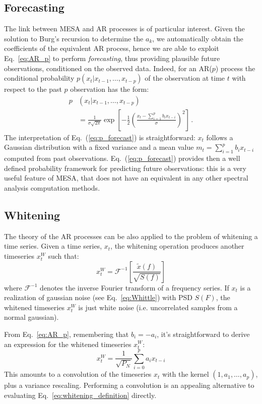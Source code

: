 \documentclass{aa}
\begin{document}
\subsection{Forecasting} \label{sec:forecasting}
The link between MESA and AR processes is of particular interest. Given the solution to Burg's recursion to determine the $a_k$, we automatically obtain the coefficients of the equivalent AR process, hence we are able to exploit Eq.~\ref{eq:AR_p} to perform \emph{forecasting}, thus providing plausible future observations, conditioned on the observed data.
Indeed, for an AR($p$) process the conditional probability $p(x_t|x_{t-1}, \ldots , x_{t-p})$ of the observation at time $t$ with respect to the past $p$ observation has the form:
\begin{align}\label{eq:p_forecast}
	p&(x_t|x_{t-1}, \ldots , x_{t-p}) \nonumber\\
	&= \frac{1}{\sigma\sqrt{2\pi}} \exp\left[-\frac{1}{2} \left(\frac{x_t - \sum_{i = 1}^p b_i x_{t-i}}{\sigma}\right)^2\right]\,.
\end{align}
The interpretation of Eq.~(\ref{eq:p_forecast}) is straightforward: $x_t$ follows a Gaussian distribution with a fixed variance and a mean value $m_t = \sum_{i = 1}^p b_i x_{t-i}$ computed from past observations.
Eq.~(\ref{eq:p_forecast}) provides then a well defined probability framework for predicting future observations: this is a very useful feature of MESA, that does not have an equivalent in any other spectral analysis computation methods.

\subsection{Whitening} \label{sec:whitening}

The theory of the AR processes can be also applied to the problem of whitening a time series.
Given a time series, $x_t$, the whitening operation produces another timeseries $x^W_t$ such that:
%
\begin{equation}\label{eq:whitening_definition}
	x^W_t = \mathcal{F}^{-1}\left[ \frac{\tilde{x}(f)}{\sqrt{S(f)}} \right]
\end{equation}
%
where $\mathcal{F}^{-1}$ denotes the inverse Fourier transform of a frequency series.
If $x_t$ is a realization of gaussian noise (see Eq.~\eqref{eq:Whittle}) with PSD $S(F)$, the whitened timeseries $x^W_t$ is just white noise (i.e. uncorrelated samples from a normal gaussian).

From Eq.~\eqref{eq:AR_p}, remembering that $b_i = - a_i$, it's straightforward to derive an expression for the whitened timeseries $x^W_t$:
\begin{equation}
	x^W_t = \frac{1}{\sqrt{P_N}} \sum_{i=0}^p a_i x_{t-i}
\end{equation}
This amounts to a convolution of the timeseries  $x_t$ with the kernel $(1, a_1, \hdots, a_p)$, plus a variance rescaling.
Performing a convolution is an appealing alternative to evaluating Eq.~\eqref{eq:whitening_definition} directly.
\end{document}
